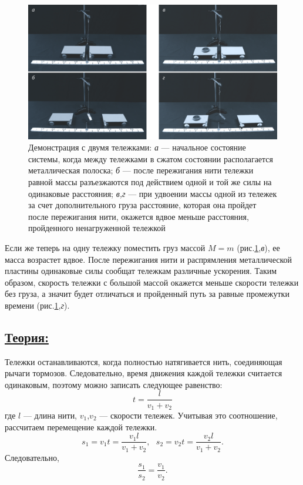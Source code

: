\documentclass[14pt,a4paper,oneside]{extarticle}	%
\begin{document}
\begin{figure}[H]
	\centering
	\includegraphics[width=1\linewidth]{newton-2.png}
	\caption{Демонстрация с двумя тележками: \textit{а} — начальное состояние системы, когда между тележками в сжатом состоянии располагается металлическая полоска; \textit{б} — после пережигания нити тележки равной массы разъезжаются под действием одной и той же силы на одинаковые расстояния; \textit{в,г} — при удвоении массы одной из тележек за счет дополнительного груза расстояние, которая она пройдет после пережигания нити, окажется вдвое меньше расстояния, пройденного ненагруженной тележкой}
	\label{newton-2}
\end{figure}

Если же теперь на одну тележку поместить груз массой  $ M = m $ (рис.\ref{newton-2},\textit{в}), ее масса возрастет вдвое.
После пережигания нити и распрямления металлической пластины одинаковые силы сообщат тележкам различные ускорения.
Таким образом, скорость тележки с большой массой окажется меньше скорости тележки без груза, а значит будет отличаться и пройденный путь за равные промежутки времени (рис.\ref{newton-2},\textit{г}).

\subsection*{\underline{Теория:}}

Тележки останавливаются, когда полностью натягивается нить, соединяющая рычаги тормозов. 
Следовательно, время движения каждой тележки считается одинаковым, поэтому можно записать следующее равенство:
\begin{equation}\label{newton-eq1}
 t = \frac{l}{v_{1} + v_{2}}
\end{equation}
где $ l $ — длина нити, $ v_{1} $,$ v_{2} $ — скорости тележек. 
Учитывая это соотношение, рассчитаем перемещение каждой тележки.
 \begin{equation}\label{newton-eq2}
 s_{1} = v_{1}t = \frac{v_{1}l}{v_{1} + v_{2}}, \text{   }
  s_{2} = v_{2}t = \frac{v_{2}l}{v_{1} + v_{2}}.
 \end{equation}
 Следовательно,
  \begin{equation}\label{newton-eq3}
 \frac{s_{1}}{s_{2}} = \frac{v_{1}}{v_{2}}.
 \end{equation}
 
\end{document}
